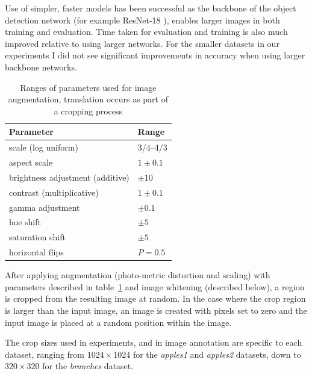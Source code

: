 Use of simpler, faster models has been successful as the backbone of the object detection network (for example ResNet-18 \cite{He}), enables larger images in both training and evaluation. Time taken for evaluation and training is also much improved relative to using larger networks. For the smaller datasets in our experiments I did not see significant improvements in accuracy when using larger backbone networks.

\begin{table}[h]
  \centering
    \caption{Ranges of parameters used for image augmentation, translation occurs as part of a cropping process}
    
  \begin{tabular}{ l  l }
    Parameter & Range \\
    \toprule
    scale (log uniform) & ${3/4}$--${4/3}$  \\ 
    aspect scale  & $ 1 \pm 0.1 $  \\ 

    brightness adjustment (additive) & $ \pm 10 $ \\ 
    contrast (multiplicative) & $ 1 \pm 0.1 $ \\ 

    gamma adjustment & $ \pm 0.1 $ \\ 

    hue shift & $ \pm 5 $ \\ 
    saturation shift & $ \pm 5 $ \\ 
    
    horizontal flips & $ P = 0.5 $ \\ 
    
    \bottomrule
  \end{tabular}
\label{tab:obj_augmentation}
\end{table}

After applying augmentation (photo-metric distortion and scaling) with parameters described in table~\ref{tab:obj_augmentation} and image whitening (described below), a region is cropped from the resulting image at random. In the case where the crop region is larger than the input image, an image is created with pixels set to zero and the input image is placed at a random position within the image.

The crop sizes used in experiments, and in image annotation are specific to each dataset, ranging from $1024\times1024$ for the \emph{apples1} and \emph{apples2} datasets, down to $320\times320$ for the \emph{branches} dataset.

